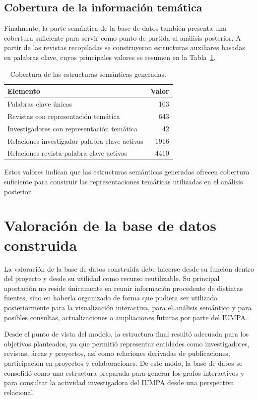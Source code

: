 \documentclass[11pt,spanish,listoffigures,listoftables]{tfgetsinf}
\begin{document}
\subsection{Cobertura de la información temática}

Finalmente, la parte semántica de la base de datos también presenta una cobertura suficiente para servir como punto de partida al análisis posterior. A partir de las revistas recopiladas se construyeron estructuras auxiliares basadas en palabras clave, cuyos principales valores se resumen en la Tabla~\ref{tab:cobertura_semantica}.

\begin{table}[H]
\centering
\small
\begin{tabular}{lr}
\toprule
\textbf{Elemento} & \textbf{Valor} \\
\midrule
Palabras clave únicas & 103 \\
Revistas con representación temática & 643 \\
Investigadores con representación temática & 42 \\
Relaciones investigador-palabra clave activas & 1916 \\
Relaciones revista-palabra clave activas & 4410 \\
\bottomrule
\end{tabular}
\caption{Cobertura de las estructuras semánticas generadas.}
\label{tab:cobertura_semantica}
\end{table}

Estos valores indican que las estructuras semánticas generadas ofrecen cobertura suficiente para construir las representaciones temáticas utilizadas en el análisis posterior.

\section{Valoración de la base de datos construida}

La valoración de la base de datos construida debe hacerse desde su función dentro del proyecto y desde su utilidad como recurso reutilizable. Su principal aportación no reside únicamente en reunir información procedente de distintas fuentes, sino en haberla organizado de forma que pudiera ser utilizada posteriormente para la visualización interactiva, para el análisis semántico y para posibles consultas, actualizaciones o ampliaciones futuras por parte del IUMPA.

Desde el punto de vista del modelo, la estructura final resultó adecuada para los objetivos planteados, ya que permitió representar entidades como investigadores, revistas, áreas y proyectos, así como relaciones derivadas de publicaciones, participación en proyectos y colaboraciones. De este modo, la base de datos se consolidó como una estructura preparada para generar los grafos interactivos y para consultar la actividad investigadora del IUMPA desde una perspectiva relacional.
\end{document}
